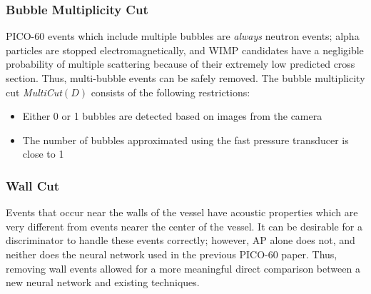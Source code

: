\documentclass[10pt]{article}
\begin{document}
\subsubsection{Bubble Multiplicity Cut}

PICO-60 events which include multiple bubbles are \textit{always} neutron events; alpha particles are stopped electromagnetically, and WIMP candidates have a negligible probability of multiple scattering because of their extremely low predicted cross section. Thus, multi-bubble events can be safely removed. The bubble multiplicity cut {\it MultiCut}$(D)$ consists of the following restrictions:

\begin{itemize}
    \item Either 0 or 1 bubbles are detected based on images from the camera
    \item The number of bubbles approximated using the fast pressure transducer is close to 1
\end{itemize}

\subsubsection{Wall Cut} \label{wall_cut}

Events that occur near the walls of the vessel have acoustic properties which are very different from events nearer the center of the vessel. It can be desirable for a discriminator to handle these events correctly; however, AP alone does not, and neither does the neural network used in the previous PICO-60 paper. Thus, removing wall events allowed for a more meaningful direct comparison between a new neural network and existing techniques.
\end{document}
